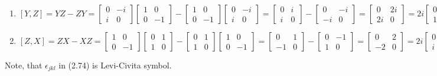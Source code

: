 \documentclass{article}
\begin{document}
\begin{framed}
\begin{enumerate}
        \item $[Y, Z] = YZ - ZY = \begin{bmatrix}0 & -i \\ i & 0 \end{bmatrix}\begin{bmatrix}1 & 0 \\ 0 & -1\end{bmatrix} - \begin{bmatrix}1 & 0 \\ 0 & -1\end{bmatrix}\begin{bmatrix}0 & -i \\ i & 0 \end{bmatrix} = \begin{bmatrix}0 & i \\ i & 0\end{bmatrix} - \begin{bmatrix}0 & -i \\ -i & 0\end{bmatrix} = \begin{bmatrix}0 & 2i \\ 2i & 0\end{bmatrix} = 2i\begin{bmatrix}0 & 1 \\ 1 & 0\end{bmatrix} = 2iX$
        \item $[Z, X] = ZX - XZ = \begin{bmatrix}1 & 0 \\ 0 & -1\end{bmatrix}\begin{bmatrix}0 & 1 \\ 1 & 0 \end{bmatrix} - \begin{bmatrix}0 & 1 \\ 1 & 0 \end{bmatrix}\begin{bmatrix}1 & 0 \\ 0 & -1\end{bmatrix} = \begin{bmatrix}0 & 1 \\ -1 & 0\end{bmatrix} - \begin{bmatrix}0 & -1 \\ 1 & 0\end{bmatrix} = \begin{bmatrix}0 & 2 \\ -2 & 0\end{bmatrix} = 2i\begin{bmatrix}0 & -i \\ i & 0\end{bmatrix} = 2iY$
    \end{enumerate}
    Note, that $\epsilon_{jkl}$ in (2.74) is Levi-Civita symbol.
\end{framed}
\end{document}
